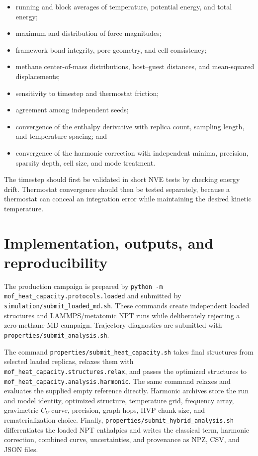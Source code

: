 \documentclass[10pt,a4paper,twocolumn]{article}
\newcommand{\cv}{\ensuremath{C_V}}
\begin{document}
\begin{itemize}
  \item running and block averages of temperature, potential energy, and total
        energy;
  \item maximum and distribution of force magnitudes;
  \item framework bond integrity, pore geometry, and cell consistency;
  \item methane center-of-mass distributions, host--guest distances, and
        mean-squared displacements;
  \item sensitivity to timestep and thermostat friction;
  \item agreement among independent seeds;
  \item convergence of the enthalpy derivative with replica count, sampling
        length, and temperature spacing; and
  \item convergence of the harmonic correction with independent minima,
        precision, sparsity depth, cell size, and mode treatment.
\end{itemize}

The timestep should first be validated in short NVE tests by checking energy
drift. Thermostat convergence should then be tested separately, because a
thermostat can conceal an integration error while maintaining the desired
kinetic temperature.

\section{Implementation, outputs, and reproducibility}

The production campaign is prepared by
\texttt{python -m mof\_heat\_capacity.protocols.loaded} and submitted by
\texttt{simulation/submit\_loaded\_md.sh}. These commands create independent
loaded structures and LAMMPS/metatomic NPT runs while deliberately rejecting a
zero-methane MD campaign. Trajectory diagnostics are submitted with
\texttt{properties/submit\_analysis.sh}.

The command \texttt{properties/submit\_heat\_capacity.sh} takes final structures
from selected loaded replicas, relaxes them with
\texttt{mof\_heat\_capacity.structures.relax}, and passes the optimized
structures to \texttt{mof\_heat\_capacity.analysis.harmonic}. The same command
relaxes and evaluates the supplied empty reference directly. Harmonic archives
store the run and model identity, optimized structure, temperature grid,
frequency array, gravimetric \cv{} curve, precision, graph hops, HVP chunk
size, and rematerialization choice. Finally,
\texttt{properties/submit\_hybrid\_analysis.sh} differentiates the loaded NPT
enthalpies and writes the classical term, harmonic correction, combined curve,
uncertainties, and provenance as NPZ, CSV, and JSON files.
\end{document}
